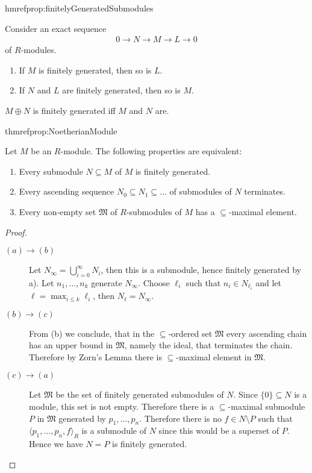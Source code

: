 \documentclass[DIV=14,parskip=full,pointednumbers]{scrartcl}
\newenvironment{alphanumerate}{\begin{enumerate}[label={\upshape(\alph*)}]}{\end{enumerate}}
\newenvironment{rmnumerate}{\begin{enumerate}[label={\upshape(\roman*)}]}{\end{enumerate}}
\theoremstyle{cthm}
\theoremstyle{cvarthm}
\theoremstyle{cdef}
\newcommand{\lbl}[1]{
	\label{#1}
	\edef\dummy{\curthm}
	\expandafter\xdef\csname thmref#1\endcsname{\dummy}
}
\newcommand{\longto}{\longrightarrow}
\begin{document}
\begin{prop} \lbl{prop:finitelyGeneratedSubmodules}
 Consider an exact sequence
 \begin{align*}
 	0\longto N\longto M\longto L\longto 0
 \end{align*}
 of $R$-modules.
 \begin{rmnumerate}
  \item If $M$ is finitely generated, then so is $L$.
  \item If $N$ and $L$ are finitely generated, then so is $M$.
 \end{rmnumerate}
 \end{prop}
 
\begin{cor}
 $M\oplus N$ is finitely generated iff $M$ and $N$ are. 
\end{cor}
\begin{prop}\lbl{prop:NoetherianModule}
Let $M$ be an $R$-module. The following properties are equivalent:
\begin{alphanumerate}
 \item Every submodule $N\subseteq M$ of $M$ is finitely generated.
 \item Every ascending sequence $N_0\subseteq N_1\subseteq \ldots$ of submodules of $N$ terminates.
 \item Every non-empty set $\mathfrak{M}$ of $R$-submodules of $M$ has a $\subseteq$-maximal element.
\end{alphanumerate}
\end{prop}
\begin{proof}
\begin{description}
 \item [$(a)\to(b)$] Let $N_\infty = \bigcup_{i=0}^\infty N_i$, then this is a submodule, hence finitely generated by a). Let $n_1,\ldots, n_k$ generate $N_\infty$. Choose $\ell_i$ such that $n_i\in N_{\ell_i}$ and let $\ell = \max_{i\leq k}\ell_i$, then $N_\ell = N_\infty$.
 \item [$(b)\to (c)$] From (b) we conclude, that in the $\subseteq$-ordered set $\mathfrak{M}$ every ascending chain has an upper bound in $\mathfrak{M}$, namely the ideal, that terminates the chain. Therefore by Zorn's Lemma there is $\subseteq$-maximal element in $\mathfrak{M}$.
 \item[$(c)\to (a)$] Let $\mathfrak{M}$ be the set of finitely generated submodules of $N$. Since $\{0\}\subseteq N$ is a module, this set is not empty. Therefore there is a $\subseteq$-maximal submodule $P$ in $\mathfrak{M}$ generated by $p_1,\ldots, p_n$. Therefore there is no $f\in N\setminus P$ such that $\langle p_1,\ldots, p_n, f\rangle_R$ is a submodule of $N$ since this would be a superset of $P$. Hence we have $N=P$ is finitely generated.
\end{description}
\end{proof}
\end{document}
